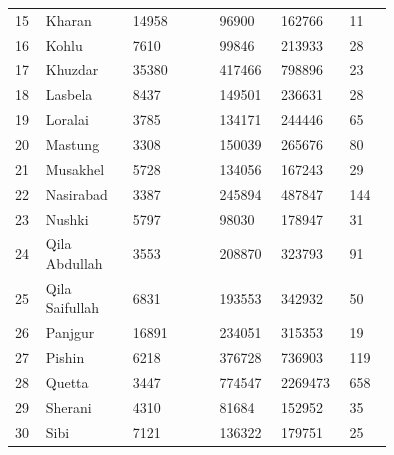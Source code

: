 \begin{longtable}[H]{|p{0.05\linewidth} | p{0.2\linewidth} | p{0.2\linewidth} | p{0.1\linewidth} | p{0.1\linewidth} | p{0.1\linewidth}|}
    15      & Kharan         & 14958                            & 96900             & 162766            & 11                \\
    16      & Kohlu          & 7610                             & 99846             & 213933            & 28                \\
    17      & Khuzdar        & 35380                            & 417466            & 798896            & 23                \\
    18      & Lasbela        & 8437                             & 149501            & 236631            & 28                \\
    19      & Loralai        & 3785                             & 134171            & 244446            & 65                \\
    20      & Mastung        & 3308                             & 150039            & 265676            & 80                \\
    21      & Musakhel       & 5728                             & 134056            & 167243            & 29                \\
    22      & Nasirabad      & 3387                             & 245894            & 487847            & 144               \\
    23      & Nushki         & 5797                             & 98030             & 178947            & 31                \\
    24      & Qila Abdullah  & 3553                             & 208870            & 323793            & 91                \\
    25      & Qila Saifullah & 6831                             & 193553            & 342932            & 50                \\
    26      & Panjgur        & 16891                            & 234051            & 315353            & 19                \\
    27      & Pishin         & 6218                             & 376728            & 736903            & 119               \\
    28      & Quetta         & 3447                             & 774547            & 2269473           & 658               \\
    29      & Sherani        & 4310                             & 81684             & 152952            & 35                \\
    30      & Sibi           & 7121                             & 136322            & 179751            & 25                \\

\end{longtable}
